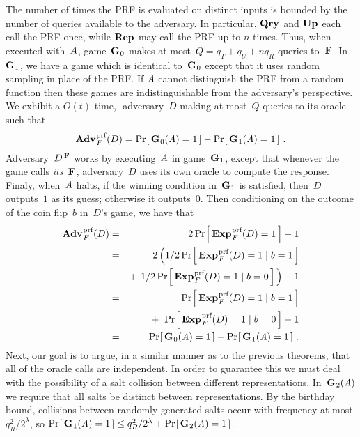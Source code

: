 The number of times the PRF is evaluated on distinct inputs is bounded by the
number of queries available to the adversary. In particular, $\textup{\textbf{Qry}}\hspace{0.5pt}$ and $\textup{\textbf{Up}}\hspace{0.5pt}$
each call the PRF once, while $\textup{\textbf{Rep}}\hspace{0.5pt}$ may call the PRF up to $n$ times. Thus,
when executed with~$\mathit{A}$, game~$\textup{\textbf{G}}\hspace{0.5pt}_0$ makes at most~$Q = q_T + q_U + nq_R$
queries to~$\textup{\textbf{F}}\hspace{0.5pt}$.
%
In~$\textup{\textbf{G}}\hspace{0.5pt}_1$, we have a game which is identical to~$\textup{\textbf{G}}\hspace{0.5pt}_0$ except that it uses
random sampling in place of the PRF. If $\mathit{A}$ cannot distinguish the PRF from
a random function then these games are indistinguishable from the adversary's
perspective.
%
We exhibit a $O(t)$-time, \prf-adversary~$D$ making at most~$Q$ queries to its
oracle such that
%
\begin{equation}
  \Adv{\prf}_F(D) = \Prob{\game_0(\advA)=1} - \Prob{\game_1(\advA)=1} \,.
\end{equation}
%
Adversary~$D^{\,\textup{\textbf{F}}\hspace{0.5pt}}$ works by executing~$\mathit{A}$ in game~$\textup{\textbf{G}}\hspace{0.5pt}_1$, except
that whenever the game calls \emph{its}~$\textup{\textbf{F}}\hspace{0.5pt}$, adversary~$D$ uses its
own oracle to compute the response.
%
Finaly, when~$\mathit{A}$ halts, if the winning condition in~$\textup{\textbf{G}}\hspace{0.5pt}_1$ is satisfied,
then~$D$ outputs~$1$ as its guess; otherwise it outputs~$0$.
%
Then conditioning on the outcome of the coin flip~$b$ in~$D$'s game, we have that
%
\begin{eqnarray}
  \Adv{\prf}_F(D) &=&
    2\Prob{\Exp{\prf}_F(D)=1}-1 \\
  &=&
    2\,\Big(
      1/2\Prob{\Exp{\prf}_F(D)=1 \given b=1} \\
  && +\hspace{4pt}
      1/2\Prob{\Exp{\prf}_F(D)=1 \given b=0}
    \Big) - 1 \\
  &=&
    \Prob{\Exp{\prf}_F(D)=1 \given b=1} \\
  && +\hspace{4pt}
      \Prob{\Exp{\prf}_F(D)=1 \given b=0}
     - 1 \\
  &=& \Prob{\game_0(\advA)=1} - \Prob{\game_1(\advA)=1} \,.
\end{eqnarray}
%
Next, our goal is to argue, in a similar manner as to the previous theorems, that all
of the oracle calls are independent. In order to guarantee this we must deal
with the possibility of a salt collision between different representations.
In~$\textup{\textbf{G}}\hspace{0.5pt}_2(\mathit{A})$ we require that all salts be distinct between
representations. By the birthday bound, collisions between randomly-generated
salts occur with frequency at most $q_R^2/2^\lambda$, so $\Pr\hspace{-1pt}\left[\,\textup{\textbf{G}}\hspace{0.5pt}_1(\mathit{A}) =
1\,\right] \le q_R^2/2^\lambda + \Pr\hspace{-1pt}\left[\,\textup{\textbf{G}}\hspace{0.5pt}_2(\mathit{A}) = 1\,\right]$.

